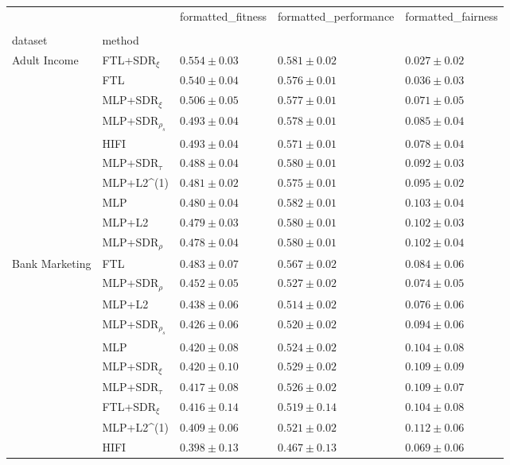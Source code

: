 \begin{tabular}{lllll}
\toprule
 &  & formatted_fitness & formatted_performance & formatted_fairness \\
 &  &  &  &  \\
dataset & method &  &  &  \\
\midrule
\multirow[t]{10}{*}{Adult Income} & FTL+SDR$_{\xi}$ & $0.554 \pm0.03$ & $0.581 \pm0.02$ & $0.027 \pm0.02$ \\
 & FTL & $0.540 \pm0.04$ & $0.576 \pm0.01$ & $0.036 \pm0.03$ \\
 & MLP+SDR$_{\xi}$ & $0.506 \pm0.05$ & $0.577 \pm0.01$ & $0.071 \pm0.05$ \\
 & MLP+SDR$_{\rho_s}$ & $0.493 \pm0.04$ & $0.578 \pm0.01$ & $0.085 \pm0.04$ \\
 & HIFI & $0.493 \pm0.04$ & $0.571 \pm0.01$ & $0.078 \pm0.04$ \\
 & MLP+SDR$_{\tau}$ & $0.488 \pm0.04$ & $0.580 \pm0.01$ & $0.092 \pm0.03$ \\
 & MLP+L2^{(1)} & $0.481 \pm0.02$ & $0.575 \pm0.01$ & $0.095 \pm0.02$ \\
 & MLP & $0.480 \pm0.04$ & $0.582 \pm0.01$ & $0.103 \pm0.04$ \\
 & MLP+L2 & $0.479 \pm0.03$ & $0.580 \pm0.01$ & $0.102 \pm0.03$ \\
 & MLP+SDR$_{\rho}$ & $0.478 \pm0.04$ & $0.580 \pm0.01$ & $0.102 \pm0.04$ \\
\cline{1-5}
\multirow[t]{10}{*}{Bank Marketing} & FTL & $0.483 \pm0.07$ & $0.567 \pm0.02$ & $0.084 \pm0.06$ \\
 & MLP+SDR$_{\rho}$ & $0.452 \pm0.05$ & $0.527 \pm0.02$ & $0.074 \pm0.05$ \\
 & MLP+L2 & $0.438 \pm0.06$ & $0.514 \pm0.02$ & $0.076 \pm0.06$ \\
 & MLP+SDR$_{\rho_s}$ & $0.426 \pm0.06$ & $0.520 \pm0.02$ & $0.094 \pm0.06$ \\
 & MLP & $0.420 \pm0.08$ & $0.524 \pm0.02$ & $0.104 \pm0.08$ \\
 & MLP+SDR$_{\xi}$ & $0.420 \pm0.10$ & $0.529 \pm0.02$ & $0.109 \pm0.09$ \\
 & MLP+SDR$_{\tau}$ & $0.417 \pm0.08$ & $0.526 \pm0.02$ & $0.109 \pm0.07$ \\
 & FTL+SDR$_{\xi}$ & $0.416 \pm0.14$ & $0.519 \pm0.14$ & $0.104 \pm0.08$ \\
 & MLP+L2^{(1)} & $0.409 \pm0.06$ & $0.521 \pm0.02$ & $0.112 \pm0.06$ \\
 & HIFI & $0.398 \pm0.13$ & $0.467 \pm0.13$ & $0.069 \pm0.06$ \\

\end{tabular}
